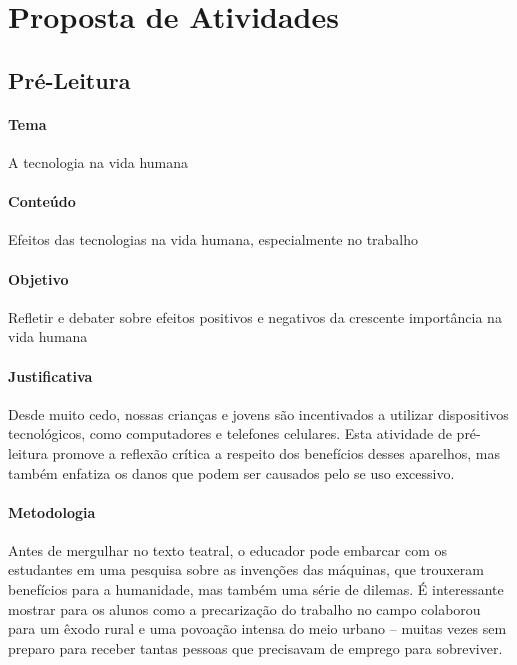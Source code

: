 \documentclass[11pt]{extarticle}
\begin{document}
\section{Proposta de Atividades}
\subsection{Pré-Leitura}


\paragraph{Tema} A tecnologia na vida humana

\paragraph{Conteúdo} Efeitos das tecnologias na vida humana, especialmente no trabalho 

\paragraph{Objetivo} Refletir e debater sobre efeitos positivos e negativos da crescente importância na vida humana 

\paragraph{Justificativa} Desde muito cedo, nossas crianças e jovens são incentivados a utilizar dispositivos tecnológicos, como computadores e telefones celulares. Esta atividade de pré-leitura promove a reflexão crítica a respeito dos benefícios desses aparelhos, mas também enfatiza os danos que podem ser causados pelo se uso excessivo.  

\paragraph{Metodologia} Antes de mergulhar no texto teatral, o educador pode embarcar com os estudantes em uma pesquisa sobre as invenções das máquinas, que trouxeram benefícios para a humanidade, mas também uma série de dilemas. É interessante mostrar para os alunos como a precarização do trabalho no campo colaborou para um êxodo rural e uma povoação intensa do meio urbano -- muitas vezes sem preparo para receber tantas pessoas que precisavam de emprego para sobreviver. 
\end{document}

